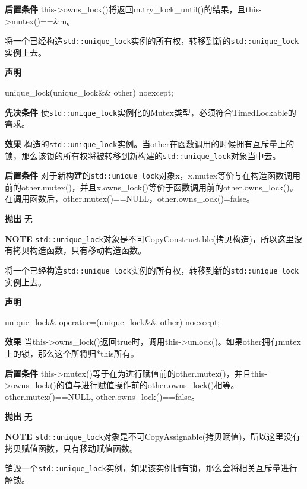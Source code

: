 \textbf{后置条件}
this->owns\_lock()将返回m.try\_lock\_until()的结果，且this->mutex()==\&m。


将一个已经构造\texttt{std::unique\_lock}实例的所有权，转移到新的\texttt{std::unique\_lock}实例上去。

\textbf{声明}

\begin{cpp}
unique_lock(unique_lock&& other) noexcept;
\end{cpp}

\textbf{先决条件}
使\texttt{std::unique\_lock}实例化的Mutex类型，必须符合TimedLockable的需求。

\textbf{效果}
构造的\texttt{std::unique\_lock}实例。当other在函数调用的时候拥有互斥量上的锁，那么该锁的所有权将被转移到新构建的\texttt{std::unique\_lock}对象当中去。

\textbf{后置条件}
对于新构建的\texttt{std::unique\_lock}对象x，x.mutex等价与在构造函数调用前的other.mutex()，并且x.owns\_lock()等价于函数调用前的other.owns\_lock()。在调用函数后，other.mutex()==NULL，other.owns\_lock()=false。

\textbf{抛出}
无

\textbf{NOTE} \texttt{std::unique\_lock}对象是不可CopyConstructible(拷贝构造)，所以这里没有拷贝构造函数，只有移动构造函数。


将一个已经构造\texttt{std::unique\_lock}实例的所有权，转移到新的\texttt{std::unique\_lock}实例上去。

\textbf{声明}

\begin{cpp}
unique_lock& operator=(unique_lock&& other) noexcept;
\end{cpp}

\textbf{效果}
当this->owns\_lock()返回true时，调用this->unlock()。如果other拥有mutex上的锁，那么这个所将归*this所有。

\textbf{后置条件}
this->mutex()等于在为进行赋值前的other.mutex()，并且this->owns\_lock()的值与进行赋值操作前的other.owns\_lock()相等。other.mutex()==NULL, other.owns\_lock()==false。

\textbf{抛出}
无

\textbf{NOTE} \texttt{std::unique\_lock}对象是不可CopyAssignable(拷贝赋值)，所以这里没有拷贝赋值函数，只有移动赋值函数。


销毁一个\texttt{std::unique\_lock}实例，如果该实例拥有锁，那么会将相关互斥量进行解锁。

